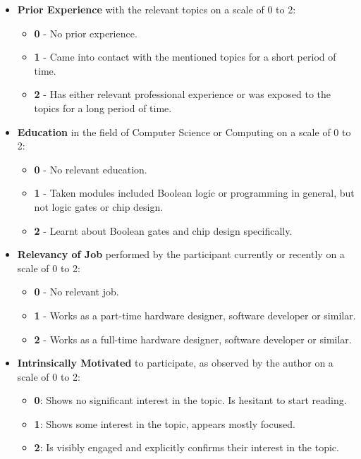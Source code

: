 \begin{itemize}
    \item \textbf{Prior Experience} with the relevant topics on a scale of 0 to 2:
        \begin{itemize}[]
            \item \textbf{0} - No prior experience.
            \item \textbf{1} - Came into contact with the mentioned topics for a short period of time.
            \item \textbf{2} - Has either relevant professional experience or was exposed to the topics for a long period of time.
        \end{itemize}
    \item \textbf{Education} in the field of Computer Science or Computing on a scale of 0 to 2:
    \begin{itemize}[]
        \item \textbf{0} - No relevant education.
        \item \textbf{1} - Taken modules included Boolean logic or programming in general, but not logic gates or chip design.
        \item \textbf{2} - Learnt about Boolean gates and chip design specifically.
    \end{itemize}
    \item \textbf{Relevancy of Job} performed by the participant currently or recently on a scale of 0 to 2:
    \begin{itemize}[]
        \item \textbf{0} - No relevant job.
        \item \textbf{1} - Works as a part-time hardware designer, software developer or similar.
        \item \textbf{2} - Works as a full-time hardware designer, software developer or similar.
    \end{itemize}
    \item \textbf{Intrinsically Motivated} to participate, as observed by the author on a scale of 0 to 2:
    \begin{itemize}[]
        \item \textbf{0}: Shows no significant interest in the topic. Is hesitant to start reading.
        \item \textbf{1}: Shows some interest in the topic, appears mostly focused.
        \item \textbf{2}: Is visibly engaged and explicitly confirms their interest in the topic.
    \end{itemize}

\end{itemize}
